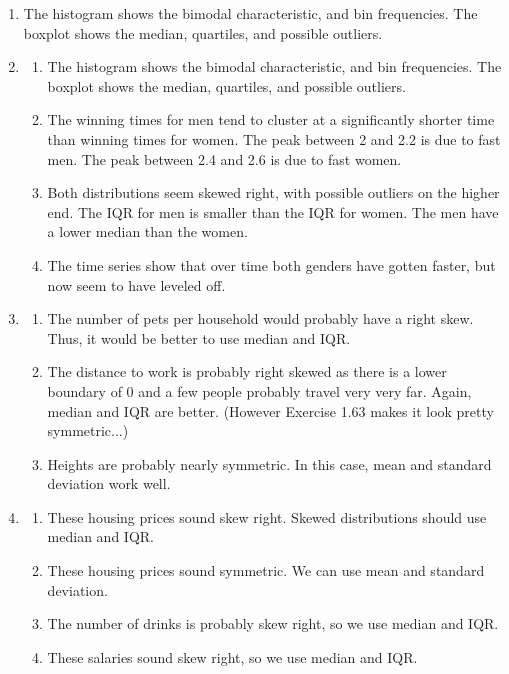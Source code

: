 \documentclass[12pt,letterpaper]{article}
\begin{document}
\begin{enumerate}
\item The histogram shows the bimodal characteristic, and bin frequencies. The boxplot shows the median, quartiles, and possible outliers. 

\item \begin{enumerate}
\item The histogram shows the bimodal characteristic, and bin frequencies. The boxplot shows the median, quartiles, and possible outliers. 
\item The winning times for men tend to cluster at a significantly shorter time than winning times for women. The peak between 2 and 2.2 is due to fast men. The peak between 2.4 and 2.6 is due to fast women.
\item Both distributions seem skewed right, with possible outliers on the higher end. The IQR for men is smaller than the IQR for women. The men have a lower median than the women.
\item The time series show that over time both genders have gotten faster, but now seem to have leveled off.
\end{enumerate}

\item \begin{enumerate} \item The number of pets per household would probably have a right skew. Thus, it would be better to use median and IQR.
\item The distance to work is probably right skewed as there is a lower boundary of 0 and a few people probably travel very very far. Again, median and IQR are better. (However Exercise 1.63 makes it look pretty symmetric...)
\item Heights are probably nearly symmetric. In this case, mean and standard deviation work well.
\end{enumerate}

\item \begin{enumerate} \item These housing prices sound skew right. Skewed distributions should use median and IQR.
\item These housing prices sound symmetric. We can use mean and standard deviation.
\item The number of drinks is probably skew right, so we use median and IQR.
\item These salaries sound skew right, so we use median and IQR.
\end{enumerate}


\end{enumerate}
\end{document}
